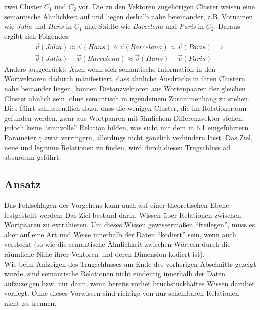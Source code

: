 \begin{itemize}
  zwei Cluster $C_1$ und $C_2$ vor. Die zu den Vektoren zugehörigen Cluster weisen eine semantische Ähnlichkeit auf
  und liegen deshalb nahe beieinander, z.B. Vornamen wie \emph{Julia} und \emph{Hans} in $C_1$ und Städte wie
  \emph{Barcelona} und \emph{Paris} in $C_2$. Daraus ergibt sich Folgendes:
  \begin{equation}
    \begin{split}
      \vec{v}(Julia) \approx \vec{v}(Hans) \land \vec{v}(Barcelona) \approx \vec{v}(Paris) \implies \\
      \vec{v}(Julia) - \vec{v}(Barcelona) \approx \vec{v}(Hans) - \vec{v}(Paris)
    \end{split}
  \end{equation}
  Anders ausgedrückt: Auch wenn sich semantische Information in den Wortvektoren dadurch manifestiert, dass ähnliche
  Ausdrücke in ihren Clustern nahe beinander liegen, können Distanzvektoren aus Wortenpaaren der gleichen Cluster ähnlich sein,
  ohne semantisch in irgendeinem Zusammenhang zu stehen. Dies führt schlussendlich dazu, dass die wenigen Cluster, die
  im Relationsraum gefunden werden, zwar aus Wortpaaren mit ähnlichem Differenzvektor stehen, jedoch keine ``sinnvolle''
  Relation bilden, was sicht mit dem in 6.1 eingeführtern Parameter $\gamma$ zwar verringern, allerdings nicht gänzlich
  verhindern lässt. Das Ziel, neue und legitime Relationen zu finden, wird durch diesen Trugschluss ad absurdum geführt.

\end{itemize}

\subsection{Ansatz}

Das Fehlschlagen des Vorgehens kann auch auf einer theoretischen Ebene festgestellt werden: Das Ziel bestand darin, Wissen
über Relationen zwischen Wortpaaren zu extrahieren. Um dieses Wissen gewissermaßen ``freilegen'', muss es aber auf eine
Art und Weise innerhalb der Daten ``kodiert'' sein, wenn auch versteckt (so wie die semantische Ähnlichkeit zwischen Wörtern
durch die räumliche Nähe ihrer Vektoren und deren Dimension kodiert ist).\\
Wie beim Aufzeigen des Trugschlusses am Ende des vorherigen Abschnitts gezeigt wurde, sind semantische Relationen nicht eindeutig
innerhalb der Daten aufzuzeigen bzw. nur dann, wenn bereits vorher bruchstückhaftes Wissen darüber vorliegt. Ohne
dieses Vorwissen sind richtige von nur scheinbaren Relationen nicht zu trennen.
